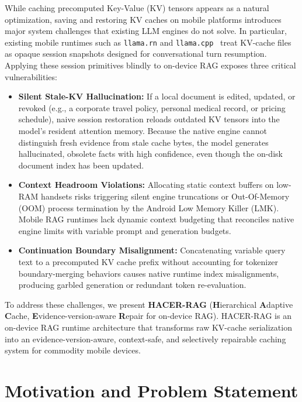 While caching precomputed Key-Value (KV) tensors appears as a natural optimization, saving and restoring KV caches on mobile platforms introduces major system challenges that existing LLM engines do not solve. In particular, existing mobile runtimes such as \texttt{llama.rn} and \texttt{llama.cpp}~\cite{gerganov2023llamacpp} treat KV-cache files as opaque session snapshots designed for conversational turn resumption. Applying these session primitives blindly to on-device RAG exposes three critical vulnerabilities:
\begin{itemize}
    \item \textbf{Silent Stale-KV Hallucination:} If a local document is edited, updated, or revoked (e.g., a corporate travel policy, personal medical record, or pricing schedule), naive session restoration reloads outdated KV tensors into the model's resident attention memory. Because the native engine cannot distinguish fresh evidence from stale cache bytes, the model generates hallucinated, obsolete facts with high confidence, even though the on-disk document index has been updated.
    \item \textbf{Context Headroom Violations:} Allocating static context buffers on low-RAM handsets risks triggering silent engine truncations or Out-Of-Memory (OOM) process termination by the Android Low Memory Killer (LMK). Mobile RAG runtimes lack dynamic context budgeting that reconciles native engine limits with variable prompt and generation budgets.
    \item \textbf{Continuation Boundary Misalignment:} Concatenating variable query text to a precomputed KV cache prefix without accounting for tokenizer boundary-merging behaviors causes native runtime index misalignments, producing garbled generation or redundant token re-evaluation.
\end{itemize}

To address these challenges, we present \textbf{HACER-RAG} (\textbf{H}ierarchical \textbf{A}daptive \textbf{C}ache, \textbf{E}vidence-version-aware \textbf{R}epair for on-device RAG). HACER-RAG is an on-device RAG runtime architecture that transforms raw KV-cache serialization into an evidence-version-aware, context-safe, and selectively repairable caching system for commodity mobile devices.

\section{Motivation and Problem Statement}
\label{sec:motivation}

